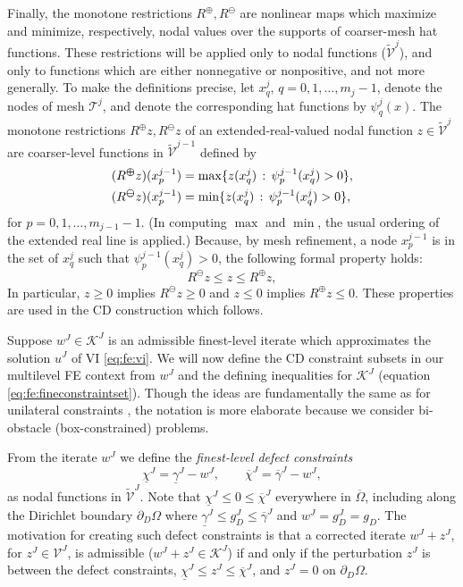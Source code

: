 \documentclass[letterpaper,final,12pt,reqno]{amsart}
\theoremstyle{cstyle}
\theoremstyle{cstyle*}
\theoremstyle{dstyle}
\numberwithin{equation}{section}
\numberwithin{figure}{section}
\numberwithin{table}{section}
\numberwithin{theorem}{section}
\newcommand{\cK}{\mathcal{K}}
\newcommand{\cV}{\mathcal{V}}
\newcommand{\maxR}{R^{\bm{\oplus}}}
\newcommand{\minR}{R^{\bm{\ominus}}}
\begin{document}
Finally, the monotone restrictions $\maxR,\minR$ are nonlinear maps which maximize and minimize, respectively, nodal values over the supports of coarser-mesh hat functions.  These restrictions will be applied only to nodal functions ($\tilde{\mathcal{V}}^j$), and only to functions which are either nonnegative or nonpositive, and not more generally.  To make the definitions precise, let $x_q^j$, $q=0,1,\dots,m_j-1$, denote the nodes of mesh $\mathcal{T}^j$, and denote the corresponding hat functions \cite{Elmanetal2014} by $\psi_q^j(x)$.  The monotone restrictions $\maxR z,\minR z$ of an extended-real-valued nodal function $z\in\tilde{\mathcal{V}}^j$ are coarser-level functions in $\tilde{\mathcal{V}}^{j-1}$ defined by
\begin{align}
(\maxR z)(x_p^{j-1}) &= \max \{z(x_q^j) \,:\, \psi_p^{j-1}(x_q^j) > 0\}, \label{eq:fe:monotonerestrictions} \\
(\minR z)(x_p^{j-1}) &= \min \{z(x_q^j) \,:\, \psi_p^{j-1}(x_q^j) > 0\}, \notag
\end{align}
for $p=0,1,\dots,m_{j-1}-1$.  (In computing $\max$ and $\min$, the usual ordering of the extended real line is applied.)  Because, by mesh refinement, a node $x_p^{j-1}$ is in the set of $x_q^j$ such that $\psi_p^{j-1}(x_q^j)>0$, the following formal property holds:
\begin{equation}
\minR z \le z \le \maxR z,  \label{eq:fe:monotonerestrictionprops}
\end{equation}
In particular, $z\ge 0$ implies $\minR z \ge 0$ and $z \le 0$ implies $\maxR z \le 0$.  These properties are used in the CD construction which follows.

Suppose $w^J \in \cK^J$ is an admissible finest-level iterate which approximates the solution $u^J$ of VI \eqref{eq:fe:vi}.  We will now define the CD constraint subsets in our multilevel FE context from $w^J$ and the defining inequalities for $\cK^J$ (equation \eqref{eq:fe:fineconstraintset}).  Though the ideas are fundamentally the same as for unilateral constraints \cite{GraeserKornhuber2009}, the notation is more elaborate because we consider bi-obstacle (box-constrained) problems.

From the iterate $w^J$ we define the \emph{finest-level defect constraints}
\begin{equation}
\underline{\chi}^J = \underline{\gamma}^J - w^J, \qquad \overline{\chi}^J = \overline{\gamma}^J - w^J, \label{eq:fe:defectconstraints}
\end{equation}
as nodal functions in $\tilde{\mathcal{V}}^J$.  Note that $\underline{\chi}^J \le 0 \le \overline{\chi}^J$ everywhere in $\overline{\Omega}$, including along the Dirichlet boundary $\partial_D\Omega$ where $\underline{\gamma}^J \le g_D^J \le \overline{\gamma}^J$ and $w^J = g_D^J = g_D$.  The motivation for creating such defect constraints \cite{GraeserKornhuber2009} is that a corrected iterate $w^J + z^J$, for $z^J\in\cV^J$, is admissible ($w^J + z^J \in \cK^J$) if and only if the perturbation $z^J$ is between the defect constraints, $\underline{\chi}^J \le z^J \le \overline{\chi}^J$, and $z^J=0$ on $\partial_D\Omega$.
\end{document}
